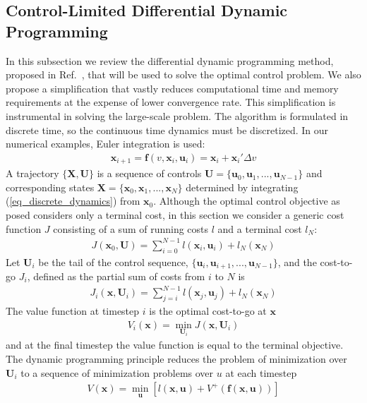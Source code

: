 \documentclass[journal ]{new-aiaa}
\newcommand{\state}{\ensuremath{\mathbf{x}}}
\newcommand{\control}{\ensuremath{\mathbf{u}}}
\newcommand{\State}{\ensuremath{\mathbf{X}}}
\newcommand{\Control}{\ensuremath{\mathbf{U}}}
\begin{document}
\subsection*{Control-Limited Differential Dynamic Programming}
In this subsection we review the differential dynamic programming method, proposed in Ref.~\cite{DDP_ControlLimited}, that will be used to solve the optimal control problem. We also propose a simplification that vastly reduces computational time and memory requirements at the expense of lower convergence rate. This simplification is instrumental in solving the large-scale problem.
The algorithm is formulated in discrete time, so the continuous time dynamics must be discretized. In our numerical examples, Euler integration is used:
\begin{align}
\state_{i+1} = \mathbf{f}(v, \state_i,\control_i) = \state_i + \state_i'\Delta v \label{eq_discrete_dynamics}
\end{align}
A trajectory $\{\State,\Control\}$ is a sequence of controls $ \Control=\{\control_0,\control_1,...,\control_{N-1}\} $ and corresponding states $\State=\{\state_0,\state_1,...,\state_N\}$ determined by integrating (\ref{eq_discrete_dynamics}) from $\state_0$.
Although the optimal control objective as posed considers only a terminal cost, in this section we consider a generic cost function $J$ consisting of a sum of running costs $l$ and a terminal cost $l_N$:
\begin{align}
J(\state_0,\Control) = \sum_{i=0}^{N-1}l(\state_i,\control_i) + l_N(\state_N)
\end{align}
Let $\Control_i$ be the tail of the control sequence, $\{\control_i,\control_{i+1},...,\control_{N-1}\}$, and the cost-to-go $J_i$, defined as the partial sum of costs from $i$ to $N$ is
\begin{align}
J_i(\state,\Control_i) = \sum_{j=i}^{N-1}l(\state_j,\control_j) + l_N(\state_N)
\end{align}
The value function at timestep $i$ is the optimal cost-to-go at \state
\begin{align}
V_i(\state) = \min_{\Control_i} J(\state, \Control_i)
\end{align}
and at the final timestep the value function is equal to the terminal objective. The dynamic programming principle reduces the problem of minimization over $\Control_i$ to a sequence of minimization problems over $u$ at each timestep 
\begin{align}
V(\state) = \min_{\control}\left[l(\state,\control) + V^+(\mathbf{f}(\state,\control))\right] \label{eq_dynamic_programming}
\end{align}
\end{document}
